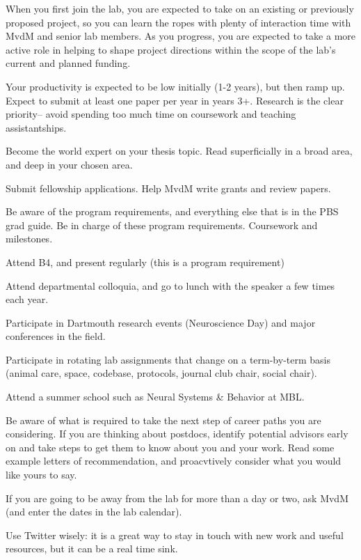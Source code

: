 \documentclass{tufte-book}
\begin{document}
When you first join the lab, you are expected to take on an existing
or previously proposed project, so you can learn the ropes with plenty
of interaction time with MvdM and senior lab members. As you progress,
you are expected to take a more active role in helping to shape
project directions within the scope of the lab's current and planned
funding.

Your productivity is expected to be low initially (1-2 years), but
then ramp up. Expect to submit at least one paper per year in years
3+. Research is the clear priority-- avoid spending too much time on
coursework and teaching assistantships.

Become the world expert on your thesis topic. Read superficially in a
broad area, and deep in your chosen area.

Submit fellowship applications. Help MvdM write grants and review
papers.

Be aware of the program requirements, and everything else that is in
the PBS grad guide.  Be in charge of these program
requirements. Coursework and milestones.

Attend B4, and present regularly (this is a program requirement)

Attend departmental colloquia, and go to lunch with the speaker a few
times each year.

Participate in Dartmouth research events (Neuroscience Day) and major
conferences in the field.

Participate in rotating lab assignments that change on a term-by-term
basis (animal care, space, codebase, protocols, journal club chair,
social chair).

Attend a summer school such as Neural Systems \& Behavior at
MBL.

Be aware of what is required to take the next step of career paths you
are considering. If you are thinking about
postdocs, identify potential advisors early on and take steps to get
them to know about you and your work. Read some example letters of
recommendation, and proacvtively consider what you would like yours to say. 

If you are going to be away from the lab for more than a day or two,
ask MvdM (and enter the dates in the lab calendar).

Use Twitter wisely: it is a great way to stay in touch with new work
and useful resources, but it can be a real time sink.
\end{document}
